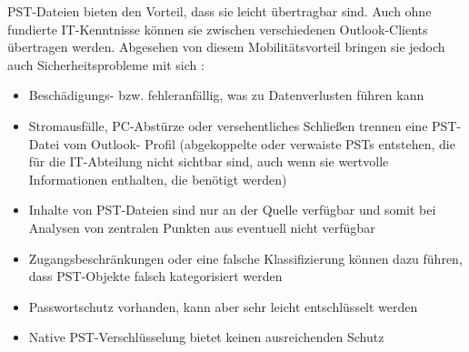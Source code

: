 PST-Dateien bieten den Vorteil, dass sie leicht übertragbar sind. Auch ohne fundierte IT-Kenntnisse können sie zwischen verschiedenen Outlook-Clients übertragen werden. Abgesehen von diesem Mobilitätsvorteil bringen sie jedoch auch Sicherheitsprobleme mit sich \cite{.26.06.2022}:

\begin{itemize}
    \item Beschädigungs- bzw. fehleranfällig, was zu Datenverlusten führen kann
    \item Stromausfälle, PC-Abstürze oder versehentliches Schließen trennen eine PST-Datei vom Outlook-
    Profil (abgekoppelte oder verwaiste PSTs entstehen, die für die IT-Abteilung nicht sichtbar sind,
    auch wenn sie wertvolle Informationen enthalten, die benötigt werden)
    \item Inhalte von PST-Dateien sind nur an der Quelle verfügbar und somit bei Analysen von zentralen Punkten aus eventuell nicht verfügbar
    \item Zugangsbeschränkungen oder eine falsche Klassifizierung können dazu führen, dass PST-Objekte
    falsch kategorisiert werden
    \item Passwortschutz vorhanden, kann aber sehr leicht entschlüsselt werden
    \item Native PST-Verschlüsselung bietet keinen ausreichenden Schutz
\end{itemize}
